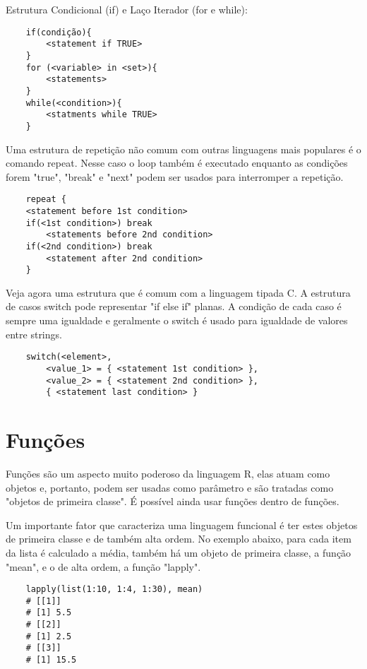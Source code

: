 \documentclass[12pt]{article}
\begin{document}
Estrutura Condicional (if) e Laço Iterador (for e while):

\begin{verbatim}
    if(condição){
        <statement if TRUE>
    }
    for (<variable> in <set>){
        <statements>
    }
    while(<condition>){
        <statments while TRUE>
    }
\end{verbatim}

Uma estrutura de repetição não comum com outras linguagens mais populares é o comando repeat. Nesse caso o loop também é executado enquanto as condições forem "true", "break" e "next" podem ser usados para interromper a repetição.

\begin{verbatim}
    repeat {
    <statement before 1st condition>
    if(<1st condition>) break
        <statements before 2nd condition>
    if(<2nd condition>) break
        <statement after 2nd condition>
    }
\end{verbatim}

Veja agora uma estrutura que é comum com a linguagem tipada C. A estrutura de casos switch pode representar "if else if" planas. A condição de cada caso é sempre uma igualdade e geralmente o switch é usado para igualdade de valores entre strings.

\begin{verbatim}
    switch(<element>,
        <value_1> = { <statement 1st condition> },
        <value_2> = { <statement 2nd condition> },
        { <statement last condition> }
\end{verbatim}

\section{Funções} \label{sec:Funções}

Funções são um aspecto muito poderoso da linguagem R, elas atuam como objetos e, portanto, podem ser usadas como parâmetro e são tratadas como "objetos de primeira classe". É possível ainda usar funções dentro de funções.

Um importante fator que caracteriza uma linguagem funcional é ter estes objetos de primeira classe e de também alta ordem. No exemplo abaixo, para cada item da lista é calculado a média, também há um objeto de primeira classe, a função "mean", e o de alta ordem, a função "lapply".

\begin{verbatim}
    lapply(list(1:10, 1:4, 1:30), mean)
    # [[1]]
    # [1] 5.5
    # [[2]]
    # [1] 2.5
    # [[3]]
    # [1] 15.5
\end{verbatim}
\end{document}
